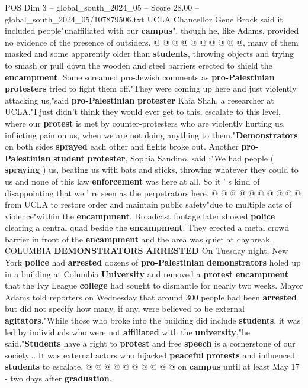 \begin{textsample}{POS Dim 3 – global\_south\_2024\_05 – Score 28.00 – global\_south\_2024\_05/107879506.txt}
UCLA Chancellor Gene Brock said it included people"unaffiliated with our \textbf{campus}", though he, like Adams, provided no evidence of the presence of outsiders. @ @ @ @ @ @ @ @ @ @, many of them masked and some apparently older than \textbf{students}, throwing objects and trying to smash or pull down the wooden and steel barriers erected to shield the \textbf{encampment}.
Some screamed pro-Jewish comments as \textbf{pro-Palestinian} \textbf{protesters} tried to fight them off."They were coming up here and just violently attacking us,"said \textbf{pro-Palestinian} \textbf{protester} Kaia Shah, a researcher at UCLA."I just didn't think they would ever get to this, escalate to this level, where our \textbf{protest} is met by counter-protesters who are violently hurting us, inflicting pain on us, when we are not doing anything to them."\textbf{Demonstrators} on both sides \textbf{sprayed} each other and fights broke out.
Another \textbf{pro-Palestinian} \textbf{student} \textbf{protester}, Sophia Sandino, said :"We had people ( \textbf{spraying} ) us, beating us with bats and sticks, throwing whatever they could to us and none of this law \textbf{enforcement} was here at all.
So it ' s kind of disappointing that we ' re seen as the perpetrators here. @ @ @ @ @ @ @ @ @ @ from UCLA to restore order and maintain public safety"due to multiple acts of violence"within the \textbf{encampment}.
Broadcast footage later showed \textbf{police} clearing a central quad beside the \textbf{encampment}.
They erected a metal crowd barrier in front of the \textbf{encampment} and the area was quiet at daybreak.
COLUMBIA \textbf{DEMONSTRATORS} \textbf{ARRESTED} On Tuesday night, New York \textbf{police} had \textbf{arrested} dozens of \textbf{pro-Palestinian} \textbf{demonstrators} holed up in a building at Columbia \textbf{University} and removed a \textbf{protest} \textbf{encampment} that the Ivy League \textbf{college} had sought to dismantle for nearly two weeks.
Mayor Adams told reporters on Wednesday that around 300 people had been \textbf{arrested} but did not specify how many, if any, were believed to be external \textbf{agitators}."While those who broke into the building did include \textbf{students}, it was led by individuals who were not \textbf{affiliated} with the \textbf{university},"he said."\textbf{Students} have a right to \textbf{protest} and free \textbf{speech} is a cornerstone of our society...
It was external actors who hijacked \textbf{peaceful} \textbf{protests} and influenced \textbf{students} to escalate. @ @ @ @ @ @ @ @ @ @ on \textbf{campus} until at least May 17 - two days after \textbf{graduation}.

\end{textsample}

